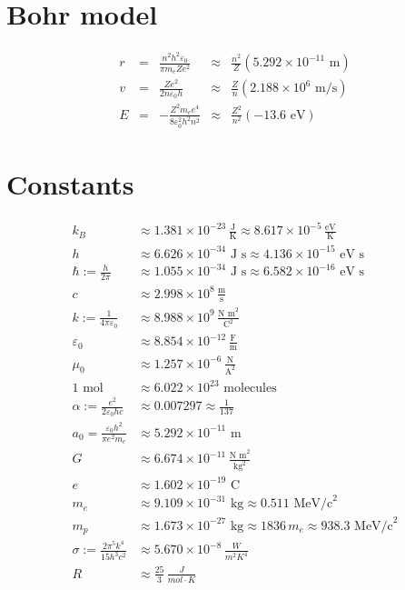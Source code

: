 \documentclass[12pt]{article}
\begin{document}
\section{Bohr model}
\begin{align*}
    r &=& \frac{n^2 h^2 \varepsilon_0}{\pi m_e Z e^2} &\approx& \frac{n^2}{Z}  (5.292\times 10^{-11} \text{ m}) \\
    v &=& \frac{Z e^2}{2 n \varepsilon_0 h} &\approx& \frac{Z}{n} (2.188\times 10^{6} \text{ m/s}) \\
    E &=& - \frac{Z^2 m_e e^4}{8 \varepsilon_0^2 h^2 n^2} &\approx& \frac{Z^2}{n^2} (-13.6 \text{ eV}) 
\end{align*}

\section{Constants}
\begin{align*}
    k_B &\approx 1.381 \times 10^{-23} \, \frac{\text{J}}{\text{K}} \approx 8.617 \times 10^{-5} \, \frac{\text{eV}}{\text{K}} \\
    h &\approx 6.626 \times 10^{-34} \text{ J s} \approx 4.136 \times 10^{-15} \text{ eV s} \\
\hbar := \frac{h}{2 \pi} &\approx 1.055 \times 10^{-34} \text{ J s} \approx 6.582 \times 10^{-16} \text{ eV s} \\
    c &\approx 2.998 \times 10^8 \, \frac{\text{m}}{\text{s}} \\
    k := \frac{1}{4 \pi \varepsilon_0} &\approx 8.988 \times 10^9 \, \frac{\text{N m}^2}{\text{C}^2} \\
    \varepsilon_0 &\approx 8.854 \times 10^{-12} \, \frac{\text{F}}{\text{m}} \\
    \mu_0 &\approx 1.257 \times 10^{-6} \, \frac{\text{N}}{\text{A}^2} \\
    1 \text{ mol} &\approx 6.022 \times 10^{23} \text{ molecules} \\
    \alpha := \frac{e^2}{2 \varepsilon_0 h c} &\approx 0.007297 \approx \frac{1}{137} \\
    a_0 = \frac{\varepsilon_0 h^2}{\pi e^2 m_e} &\approx 5.292 \times 10^{-11} \text{ m} \\
    G &\approx 6.674 \times 10^{-11} \, \frac{\text{N m}^2}{\text{kg}^2} \\
    e &\approx 1.602 \times 10^{-19} \text{ C} \\
    m_e &\approx 9.109 \times 10^{-31} \text{ kg} \approx 0.511 \text{ MeV/c}^2 \\
    m_p &\approx 1.673 \times 10^{-27} \text{ kg} \approx 1836 \, m_e \approx 938.3 \text{ MeV/c}^2 \\
    \sigma := \frac{2 \pi^5 k^4}{15 h^3 c^2} &\approx 5.670 \times 10^{-8} \, \frac{W}{m^2K^4} \\
    R &\approx \frac{25}{3} \, \frac{J}{mol \cdot K} \\
\end{align*}
\end{document}
